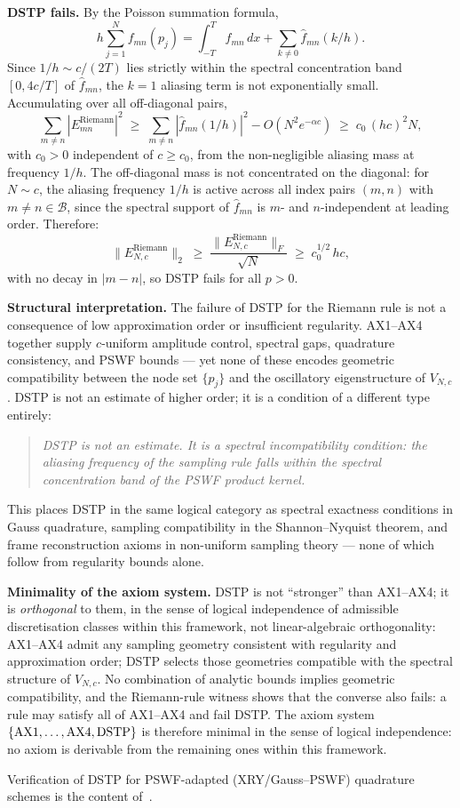 \begin{remark}
\smallskip
\noindent\textbf{DSTP fails.}
By the Poisson summation formula,
\[
  h\sum_{j=1}^N f_{mn}(p_j)
  = \int_{-T}^T f_{mn}\,dx
  + \sum_{k \ne 0} \hat{f}_{mn}(k/h).
\]
Since $1/h \sim c/(2T)$ lies strictly within the spectral
concentration band $[0, 4c/T]$ of $\hat{f}_{mn}$, the $k=1$
aliasing term is not exponentially small.
Accumulating over all off-diagonal pairs,
\[
  \sum_{m \ne n} |E_{mn}^{\mathrm{Riemann}}|^2
  \;\ge\; \sum_{m \ne n} |\hat{f}_{mn}(1/h)|^2 - O(N^2 e^{-\alpha c})
  \;\ge\; c_0\,(hc)^2 N,
\]
with $c_0 > 0$ independent of $c \ge c_0$, from the non-negligible
aliasing mass at frequency $1/h$. The off-diagonal mass is not
concentrated on the diagonal: for $N \sim c$, the aliasing frequency
$1/h$ is active across all index pairs $(m,n)$ with
$m \ne n \in \mathcal{B}$, since the spectral support of $\hat{f}_{mn}$
is $m$- and $n$-independent at leading order.
Therefore:
\[
  \|E_{N,c}^{\mathrm{Riemann}}\|_2
  \;\ge\; \frac{\|E_{N,c}^{\mathrm{Riemann}}\|_F}{\sqrt{N}}
  \;\ge\; c_0^{1/2}\,hc,
\]
with no decay in $|m-n|$, so DSTP fails for all $p > 0$.

\smallskip
\noindent\textbf{Structural interpretation.}
The failure of DSTP for the Riemann rule is not a consequence of
low approximation order or insufficient regularity.
\textup{AX1--AX4} together supply $c$-uniform amplitude control,
spectral gaps, quadrature consistency, and PSWF bounds --- yet none
of these encodes geometric compatibility between the node set
$\{p_j\}$ and the oscillatory eigenstructure of $V_{N,c}$.
DSTP is not an estimate of higher order; it is a condition of a
different type entirely:
\begin{quotation}
  \noindent\textit{DSTP is not an estimate. It is a spectral
  incompatibility condition: the aliasing frequency of the sampling
  rule falls within the spectral concentration band of the PSWF
  product kernel.}
\end{quotation}
This places DSTP in the same logical category as spectral exactness
conditions in Gauss quadrature, sampling compatibility in the
Shannon--Nyquist theorem, and frame reconstruction axioms in
non-uniform sampling theory --- none of which follow from regularity
bounds alone.

\smallskip
\noindent\textbf{Minimality of the axiom system.}
DSTP is not ``stronger'' than \textup{AX1--AX4}; it is
\emph{orthogonal} to them, in the sense of logical independence
of admissible discretisation classes within this framework,
not linear-algebraic orthogonality:
\textup{AX1--AX4} admit any sampling geometry consistent with
regularity and approximation order; DSTP selects those geometries
compatible with the spectral structure of $V_{N,c}$.
No combination of analytic bounds implies geometric compatibility,
and the Riemann-rule witness shows that the converse also fails:
a rule may satisfy all of \textup{AX1--AX4} and fail DSTP.
The axiom system $\{\textup{AX1},\dots,\textup{AX4},\textup{DSTP}\}$
is therefore minimal in the sense of logical independence:
no axiom is derivable from the remaining ones within this framework.

Verification of DSTP for PSWF-adapted (XRY/Gauss--PSWF) quadrature
schemes is the content of~\cite{PaperIIquad}.
\end{remark}
